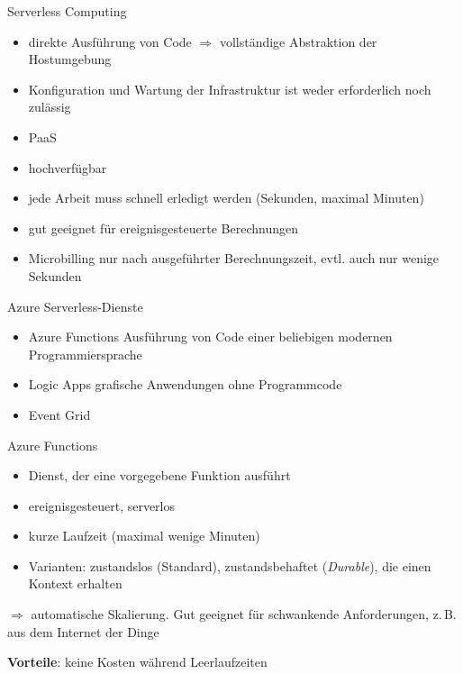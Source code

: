 \begin{flashcard}[Describe]{Serverless Computing}
    \begin{itemize}
        \item direkte Ausführung von Code\newline
        $\Rightarrow$ vollständige Abstraktion der Hostumgebung
        \item Konfiguration und Wartung der Infrastruktur ist weder erforderlich noch zulässig
        \item[$\Rightarrow$] PaaS
        \item hochverfügbar
        \item jede Arbeit muss schnell erledigt werden (Sekunden, maximal Minuten)
        \item gut geeignet für ereignisgesteuerte Berechnungen
        \item Microbilling nur nach ausgeführter Berechnungszeit, evtl. auch nur wenige Sekunden
    \end{itemize}

\end{flashcard}

\begin{flashcard}[\ ]{Azure Serverless-Dienste}
    \begin{itemize}
        \item Azure Functions\newline
        Ausführung von Code einer beliebigen modernen Programmiersprache
        \item Logic Apps\newline
        grafische Anwendungen ohne Programmcode
        \item Event Grid\newline
    \end{itemize}

\end{flashcard}

\begin{flashcard}[Definition]{Azure Functions}
    \begin{itemize}
        \item Dienst, der eine vorgegebene Funktion ausführt
        \item ereignisgesteuert, serverlos
        \item kurze Laufzeit (maximal wenige Minuten)
        \item Varianten: zustandslos (Standard), zustandsbehaftet (\emph{Durable}), die einen Kontext erhalten
    \end{itemize}
    $\Rightarrow$ automatische Skalierung. Gut geeignet für schwankende Anforderungen, z.\,B. aus dem Internet der Dinge

    \vspace{5mm}
    \textbf{Vorteile}: keine Kosten während Leerlaufzeiten
\end{flashcard}

